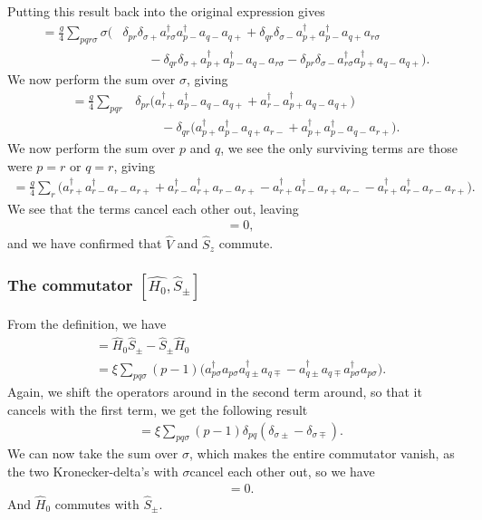 \documentclass[a4paper, 11pt, notitlepage, english]{article}
\newcommand{\op}[1]{\hat{#1}}
\begin{document}
Putting this result back into the original expression gives
\begin{align*}
[\op{V}, \op{S}_z] = \frac{g}{4}\sum_{pqr\sigma} \sigma \big(&
\delta_{pr}\delta_{\sigma+} a_{r\sigma}^\dagger  a_{p-}^\dagger a_{q-}  a_{q+}
+ \delta_{qr}\delta_{\sigma-} a_{p+}^\dagger a_{p-}^\dagger a_{q+} a_{r\sigma}\\[-0.3cm]
&\qquad- \delta_{qr}\delta_{\sigma+} a_{p+}^\dagger a_{p-}^\dagger a_{q-} a_{r\sigma}  
- \delta_{pr} \delta_{\sigma -} a_{r\sigma}^\dagger  a_{p+}^\dagger a_{q-}  a_{q+} \big).
\end{align*}
We now perform the sum over $\sigma$, giving
\begin{align*}
[\op{V}, \op{S}_z] = \frac{g}{4}\sum_{pqr} &
\delta_{pr} \big(a_{r+}^\dagger  a_{p-}^\dagger a_{q-}  a_{q+} + a_{r-}^\dagger a_{p+}^\dagger a_{q-}  a_{q+} \big) \\[-0.3cm]
&\qquad - \delta_{qr} \big( a_{p+}^\dagger a_{p-}^\dagger a_{q+} a_{r-} + a_{p+}^\dagger a_{p-}^\dagger a_{q-} a_{r+} \big).
\end{align*}
We now perform the sum over $p$ and $q$, we see the only surviving terms are those were $p=r$ or $q=r$, giving
\begin{align*}
[\op{V}, \op{S}_z] = \frac{g}{4}\sum_{r} \big(
a_{r+}^\dagger  a_{r-}^\dagger a_{r-}  a_{r+} + a_{r-}^\dagger a_{r+}^\dagger a_{r-}  a_{r+}  -  a_{r+}^\dagger a_{r-}^\dagger a_{r+} a_{r-} - a_{r+}^\dagger a_{r-}^\dagger a_{r-} a_{r+} \big).
\end{align*}
We see that the terms cancel each other out, leaving
\begin{align*}
 [\op{V}, \op{S}_z] &= 0,
\end{align*}
and we have confirmed that $\op{V}$ and $\op{S}_z$ commute.

\clearpage

\subsubsection*{The commutator $[\op{H_0}, \op{S}_\pm]$}
From the definition, we have
\begin{align*}
[\op{H}_0, \op{S}_\pm] &= \op{H}_0\op{S}_\pm - \op{S}_\pm\op{H}_0 \\
&= 
\xi \sum_{pq \sigma} (p-1) \big( a_{p\sigma}^\dagger a_{p\sigma}  a_{q\pm}^\dagger a_{q\mp}       
- a_{q\pm}^\dagger a_{q\mp} a_{p\sigma}^\dagger a_{p\sigma}\big).
\end{align*}
Again, we shift the operators around in the second term around, so that it cancels with the first term, we get the following result
\begin{align*}
[\op{H}_0, \op{S}_\pm] &= \xi \sum_{pq \sigma} (p-1) \delta_{pq} (\delta_{\sigma \pm} - \delta_{\sigma \mp}).
\end{align*}
We can now take the sum over $\sigma$, which makes the entire commutator vanish, as the two Kronecker-delta's with $\sigma $cancel each other out, so we have
\begin{align*}
[\op{H}_0, \op{S}_\pm] &= 0.
\end{align*}
And $\op{H}_0$ commutes with $\op{S}_\pm$.
\end{document}
